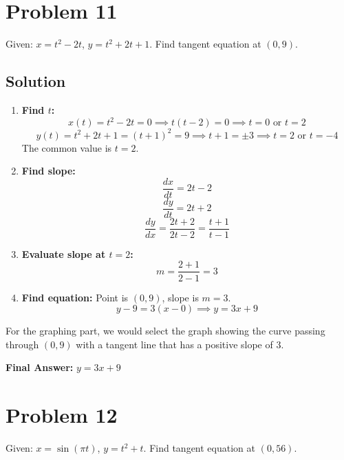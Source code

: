 \documentclass{article}
\begin{document}
\section{Problem 11}
Given: $x = t^2 - 2t$, $y = t^2 + 2t + 1$. Find tangent equation at $(0,9)$.

\subsection*{Solution}
\begin{enumerate}
    \item \textbf{Find $t$:}
    \[ x(t) = t^2 - 2t = 0 \implies t(t-2) = 0 \implies t=0 \text{ or } t=2 \]
    \[ y(t) = t^2 + 2t + 1 = (t+1)^2 = 9 \implies t+1 = \pm 3 \implies t=2 \text{ or } t=-4 \]
    The common value is $t=2$.
    \item \textbf{Find slope:}
    \[ \frac{dx}{dt} = 2t - 2 \]
    \[ \frac{dy}{dt} = 2t + 2 \]
    \[ \frac{dy}{dx} = \frac{2t+2}{2t-2} = \frac{t+1}{t-1} \]
    \item \textbf{Evaluate slope at $t=2$:}
    \[ m = \frac{2+1}{2-1} = 3 \]
    \item \textbf{Find equation:} Point is $(0,9)$, slope is $m=3$.
    \[ y - 9 = 3(x - 0) \implies y = 3x + 9 \]
\end{enumerate}
For the graphing part, we would select the graph showing the curve passing through $(0,9)$ with a tangent line that has a positive slope of 3.

\textbf{Final Answer:} $y = 3x + 9$

\section{Problem 12}
Given: $x = \sin(\pi t)$, $y = t^2 + t$. Find tangent equation at $(0, 56)$.
\end{document}
